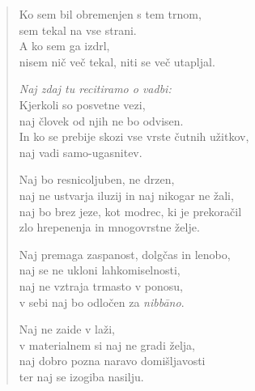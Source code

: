\clearpage
\begin{verse}

Ko sem bil obremenjen s tem trnom,\\
sem tekal na vse strani.\\
A ko sem ga izdrl,\\
nisem nič več tekal, niti se več utapljal.

\emph{Naj zdaj tu recitiramo o vadbi:}\\
Kjerkoli so posvetne vezi,\\
naj človek od njih ne bo odvisen.\\
In ko se prebije skozi vse vrste čutnih užitkov,\\
naj vadi samo-ugasnitev.

Naj bo resnicoljuben, ne drzen,\\
naj ne ustvarja iluzij in naj nikogar ne žali,\\
naj bo brez jeze, kot modrec, ki je prekoračil\\
zlo hrepenenja in mnogovrstne želje.

Naj premaga zaspanost, dolgčas in lenobo,\\
naj se ne ukloni lahkomiselnosti,\\
naj ne vztraja trmasto v ponosu,\\
v sebi naj bo odločen za \emph{nibbāno}.

Naj ne zaide v laži,\\
v materialnem si naj ne gradi želja,\\
naj dobro pozna naravo domišljavosti\\
ter naj se izogiba nasilju.

\end{verse}


